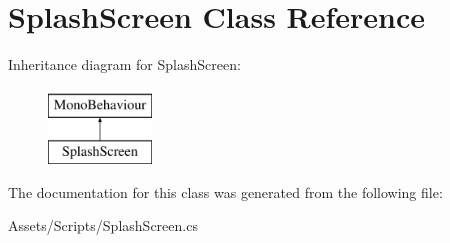 \hypertarget{class_splash_screen}{}\section{Splash\+Screen Class Reference}
\label{class_splash_screen}
Inheritance diagram for Splash\+Screen\+:\begin{figure}[H]
\begin{center}
\leavevmode
\includegraphics[height=2.000000cm]{class_splash_screen}
\end{center}
\end{figure}


The documentation for this class was generated from the following file\+:\begin{DoxyCompactItemize}
\item 
Assets/\+Scripts/Splash\+Screen.\+cs\end{DoxyCompactItemize}

